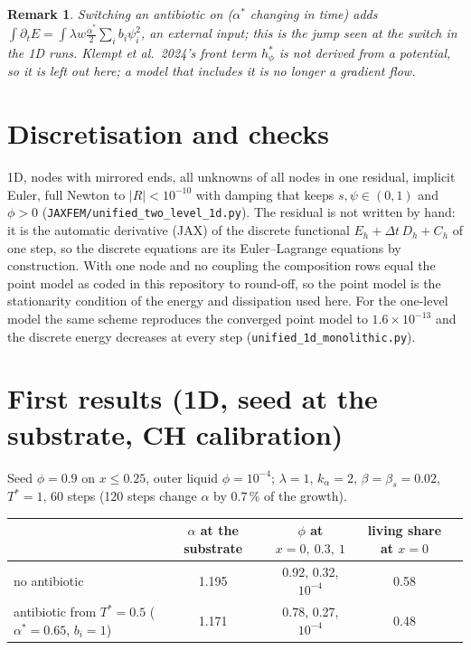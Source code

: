 \documentclass[11pt,a4paper]{article}
\newtheorem{remark}{Remark}
\begin{document}
\begin{remark}
Switching an antibiotic on ($\alpha^*$ changing in time) adds
$\int\partial_tE=\int\lambda w\tfrac{\dot\alpha^*}{2}\sum_ib_i\psi_i^2$, an external
input; this is the jump seen at the switch in the 1D runs. Klempt et al.\ 2024's front
term $h^*_\phi$ is not derived from a potential, so it is left out here; a model that
includes it is no longer a gradient flow.
\end{remark}

\section{Discretisation and checks}

1D, nodes with mirrored ends, all unknowns of all nodes in one residual, implicit Euler,
full Newton to $|R|<10^{-10}$ with damping that keeps $s,\psi\in(0,1)$ and $\phi>0$
(\texttt{JAXFEM/unified\_two\_level\_1d.py}). The residual is not written by hand: it is
the automatic derivative (JAX) of the discrete functional $E_h+\Delta t\,D_h+C_h$ of one
step, so the discrete equations are its Euler--Lagrange equations by construction. With one
node and no coupling the composition rows equal the point model as coded in this
repository to round-off, so the point model is the stationarity condition of the energy and
dissipation used here. For the one-level model the same scheme
reproduces the converged point model to $1.6\times10^{-13}$ and the discrete energy
decreases at every step (\texttt{unified\_1d\_monolithic.py}).

\section{First results (1D, seed at the substrate, CH calibration)}

Seed $\phi=0.9$ on $x\le0.25$, outer liquid $\phi=10^{-4}$; $\lambda=1$, $k_\alpha=2$,
$\beta=\beta_s=0.02$, $T^*=1$, 60 steps (120 steps change $\alpha$ by $0.7\,\%$ of the growth).

\begin{center}\small
\begin{tabular}{lcccc}
\toprule
& $\alpha$ at the substrate & $\phi$ at $x=0,\ 0.3,\ 1$ & living share at $x=0$ \\
\midrule
no antibiotic & 1.195 & 0.92, 0.32, $10^{-4}$ & 0.58\\
antibiotic from $T^*=0.5$ ($\alpha^*=0.65$, $b_i=1$) & 1.171 & 0.78, 0.27, $10^{-4}$ & 0.48\\
\bottomrule
\end{tabular}
\end{center}
\end{document}
